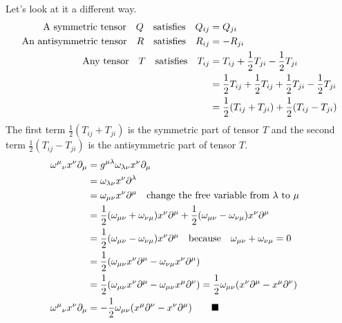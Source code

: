 \documentclass{article}
\begin{document}
Let's look at it a different way.
\begin{align*}
	\qq*{A symmetric tensor}      Q\qq{satisfies}  Q_{ij} & =Q_{ji}                                                                  \\
	\qq*{An antisymmetric tensor} R\qq{satisfies}  R_{ij} & =-R_{ji}                                                                 \\
	\qq*{Any tensor} T\qq{satisfies}               T_{ij} & =T_{ij}+\frac{1}{2}T_{ji}-\frac{1}{2}T_{ji}                              \\
	                                                      & =\frac{1}{2}T_{ij}+\frac{1}{2}T_{ij}+\frac{1}{2}T_{ji}-\frac{1}{2}T_{ji} \\
	                                                      & =\frac{1}{2}(T_{ij}+T_{ji})+\frac{1}{2}(T_{ij}-T_{ji})
\end{align*}
The first term $\frac{1}{2}(T_{ij}+T_{ji})$ is the symmetric part of tensor $T$ and the second term $\frac{1}{2}(T_{ij}-T_{ji})$ is the antisymmetric part of tensor $T$.
\begin{align*}
	\omega^\mu{}_\nu x^\nu \partial_\mu & = g^{\mu\lambda}\omega_{\lambda\nu} x^\nu  \partial_\mu                                                                                                             \\
	                                    & = \omega_{\lambda\nu} x^\nu  \partial^\lambda                                                                                                                       \\
	                                    & = \omega_{\mu\nu} x^\nu  \partial^\mu           \qq{change the free variable from $\lambda$ to $\mu$}                                                               \\
	                                    & =\frac{1}{2}(\omega_{\mu\nu}+\omega_{\nu\mu}) x^\nu  \partial^\mu+\frac{1}{2}(\omega_{\mu\nu}-\omega_{\nu\mu}) x^\nu  \partial^\mu                                  \\
	                                    & =\frac{1}{2}(\omega_{\mu\nu}-\omega_{\nu\mu}) x^\nu  \partial^\mu \qq{because}\omega_{\mu\nu}+\omega_{\nu\mu}=0                                                     \\
	                                    & =\frac{1}{2}(\omega_{\mu\nu} x^\nu  \partial^\mu-\omega_{\nu\mu} x^\nu  \partial^\mu)                                                                               \\
	                                    & =\frac{1}{2}(\omega_{\mu\nu} x^\nu  \partial^\mu-\omega_{\mu\nu} x^\mu  \partial^\nu)=        \frac{1}{2}\omega_{\mu\nu}( x^\nu  \partial^\mu- x^\mu  \partial^\nu) \\
	\omega^\mu{}_\nu x^\nu \partial_\mu & =-\frac{1}{2}\omega_{\mu\nu}(x^\mu  \partial^\nu -x^\nu  \partial^\mu )      \qquad    \blacksquare                                                                 \\
\end{align*}
\end{document}
